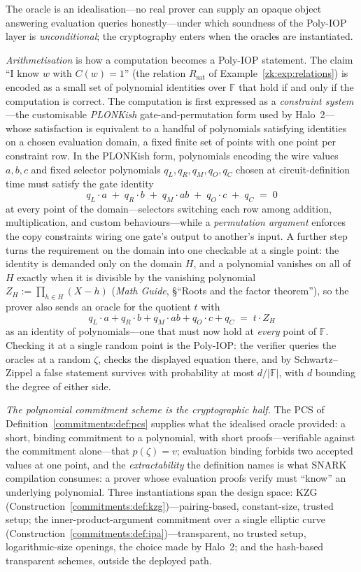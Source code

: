 \documentclass[11pt,a4paper]{article}
\theoremstyle{definition}
\theoremstyle{remark}
\newcommand{\F}{\ensuremath{\mathbb{F}}}
\providecommand{\abs}[1]{\lvert #1 \rvert}
\begin{document}
The oracle is an idealisation---no real prover can supply an opaque
object answering evaluation queries honestly---under which soundness of
the Poly-IOP layer is \emph{unconditional}; the cryptography enters when
the oracles are instantiated.

\emph{Arithmetisation} is how a computation becomes a Poly-IOP
statement. The claim ``I know \(w\) with \(C(w) = 1\)''
(the relation \(R_{\mathrm{sat}}\) of
Example~\ref{zk:exp:relations}) is encoded as a small set of
polynomial identities over \(\F\) that hold if and only if the
computation is correct. The computation is first expressed as a
\emph{constraint system}---the customisable
\emph{PLONKish} gate-and-permutation form used by Halo~2---whose
satisfaction is equivalent to a handful of polynomials satisfying
identities on a chosen evaluation domain, a fixed finite set of
points with one point per constraint row. In the PLONKish form,
polynomials encoding the wire values \(a, b, c\) and fixed selector
polynomials \(q_L, q_R, q_M, q_O, q_C\) chosen at circuit-definition
time must satisfy the gate identity
\[
q_L \cdot a \;+\; q_R \cdot b \;+\; q_M \cdot a b
\;+\; q_O \cdot c \;+\; q_C \;=\; 0
\]
at every point of the domain---selectors switching each row among
addition, multiplication, and custom behaviours---while a
\emph{permutation argument} enforces the copy constraints wiring one
gate's output to another's input. A further step turns the
requirement on the domain into one checkable at a single point: the
identity is
demanded only on the domain \(H\), and a polynomial vanishes on all
of \(H\) exactly when it is divisible by the vanishing polynomial
\(Z_H := \prod_{h \in H}(X - h)\) (\emph{Math Guide}, \S``Roots and
the factor theorem''), so the prover also sends an oracle for the
quotient \(t\) with
\[
q_L \cdot a + q_R \cdot b + q_M \cdot ab + q_O \cdot c + q_C
\;=\; t \cdot Z_H
\]
as an identity of polynomials---one that must now hold at
\emph{every} point of \(\F\). Checking it at a single random point
is the Poly-IOP: the verifier queries the oracles at a random
\(\zeta\), checks the displayed equation there, and by
Schwartz--Zippel a false statement survives with probability at
most \(d/\abs{\F}\), with \(d\) bounding the degree of either
side.

\emph{The polynomial commitment scheme is the cryptographic half.}
The PCS of Definition~\ref{commitments:def:pcs} supplies what the
idealised oracle provided: a short, binding commitment to a
polynomial, with short proofs---verifiable against the commitment
alone---that \(p(\zeta) = v\); evaluation binding forbids two
accepted values at one point, and the \emph{extractability} the
definition names is what SNARK compilation consumes: a prover whose
evaluation proofs verify must ``know'' an underlying polynomial.
Three instantiations span the design space: KZG
(Construction~\ref{commitments:def:kzg})---pairing-based,
constant-size, trusted setup; the inner-product-argument commitment
over a single elliptic curve
(Construction~\ref{commitments:def:ipa})---transparent, no trusted
setup, logarithmic-size openings, the choice made by Halo~2; and
the hash-based transparent schemes, outside the deployed path.
\end{document}
